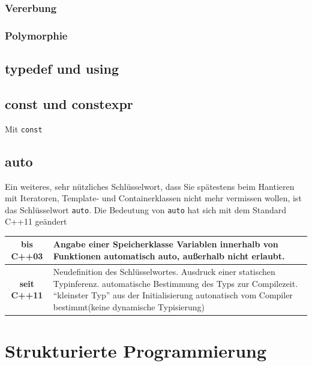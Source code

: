\documentclass[a4paper]{report}
\begin{document}
\subsection{Vererbung}

\subsection{Polymorphie}

\section{typedef und using}

\section{const und constexpr}
Mit \texttt{const} 

\section{auto}
Ein weiteres, sehr nützliches Schlüsselwort, dass Sie spätestens beim Hantieren mit Iteratoren, Template- und Containerklassen nicht mehr vermissen wollen, ist das Schlüsselwort \texttt{auto}. Die Bedeutung von \texttt{auto} hat sich mit dem Standard C++11 geändert

\begin{center}
	\begin{tabular}{|c|p{12cm}|}
		\hline
		\textbf{bis C++03} & Angabe einer Speicherklasse \newline Variablen innerhalb von Funktionen automatisch auto, außerhalb nicht erlaubt. \\ \hline
		\textbf{seit C++11} & Neudefinition des Schlüsselwortes. \newline Ausdruck einer statischen Typinferenz. \newline automatische Bestimmung des Typs zur Compilezeit. \newline
		"`kleinster Typ"' aus der Initialisierung autonatisch vom Compiler bestimmt\newline (keine dynamische Typisierung)\\ \hline
	\end{tabular}
\end{center}

\chapter{Strukturierte Programmierung}
\end{document}
